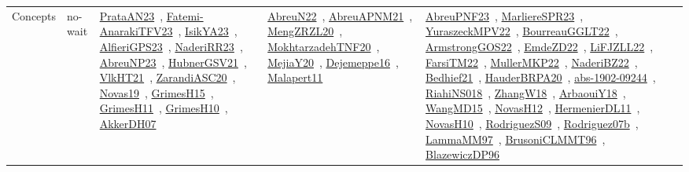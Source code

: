 {\begin{longtable}{lp{3cm}>{\raggedright\arraybackslash}p{6cm}>{\raggedright\arraybackslash}p{6cm}>{\raggedright\arraybackslash}p{8cm}}
Concepts & no-wait & \href{../works/PrataAN23.pdf}{PrataAN23}~\cite{PrataAN23}, \href{../works/Fatemi-AnarakiTFV23.pdf}{Fatemi-AnarakiTFV23}~\cite{Fatemi-AnarakiTFV23}, \href{../works/IsikYA23.pdf}{IsikYA23}~\cite{IsikYA23}, \href{../works/AlfieriGPS23.pdf}{AlfieriGPS23}~\cite{AlfieriGPS23}, \href{../works/NaderiRR23.pdf}{NaderiRR23}~\cite{NaderiRR23}, \href{../works/AbreuNP23.pdf}{AbreuNP23}~\cite{AbreuNP23}, \href{../works/HubnerGSV21.pdf}{HubnerGSV21}~\cite{HubnerGSV21}, \href{../works/VlkHT21.pdf}{VlkHT21}~\cite{VlkHT21}, \href{../works/ZarandiASC20.pdf}{ZarandiASC20}~\cite{ZarandiASC20}, \href{../works/Novas19.pdf}{Novas19}~\cite{Novas19}, \href{../works/GrimesH15.pdf}{GrimesH15}~\cite{GrimesH15}, \href{../works/GrimesH11.pdf}{GrimesH11}~\cite{GrimesH11}, \href{../works/GrimesH10.pdf}{GrimesH10}~\cite{GrimesH10}, \href{../works/AkkerDH07.pdf}{AkkerDH07}~\cite{AkkerDH07} & \href{../works/AbreuN22.pdf}{AbreuN22}~\cite{AbreuN22}, \href{../works/AbreuAPNM21.pdf}{AbreuAPNM21}~\cite{AbreuAPNM21}, \href{../works/MengZRZL20.pdf}{MengZRZL20}~\cite{MengZRZL20}, \href{../works/MokhtarzadehTNF20.pdf}{MokhtarzadehTNF20}~\cite{MokhtarzadehTNF20}, \href{../works/MejiaY20.pdf}{MejiaY20}~\cite{MejiaY20}, \href{../works/Dejemeppe16.pdf}{Dejemeppe16}~\cite{Dejemeppe16}, \href{../works/Malapert11.pdf}{Malapert11}~\cite{Malapert11} & \href{../works/AbreuPNF23.pdf}{AbreuPNF23}~\cite{AbreuPNF23}, \href{../works/MarliereSPR23.pdf}{MarliereSPR23}~\cite{MarliereSPR23}, \href{../works/YuraszeckMPV22.pdf}{YuraszeckMPV22}~\cite{YuraszeckMPV22}, \href{../works/BourreauGGLT22.pdf}{BourreauGGLT22}~\cite{BourreauGGLT22}, \href{../works/ArmstrongGOS22.pdf}{ArmstrongGOS22}~\cite{ArmstrongGOS22}, \href{../works/EmdeZD22.pdf}{EmdeZD22}~\cite{EmdeZD22}, \href{../works/LiFJZLL22.pdf}{LiFJZLL22}~\cite{LiFJZLL22}, \href{../works/FarsiTM22.pdf}{FarsiTM22}~\cite{FarsiTM22}, \href{../works/MullerMKP22.pdf}{MullerMKP22}~\cite{MullerMKP22}, \href{../works/NaderiBZ22.pdf}{NaderiBZ22}~\cite{NaderiBZ22}, \href{../works/Bedhief21.pdf}{Bedhief21}~\cite{Bedhief21}, \href{../works/HauderBRPA20.pdf}{HauderBRPA20}~\cite{HauderBRPA20}, \href{../works/abs-1902-09244.pdf}{abs-1902-09244}~\cite{abs-1902-09244}, \href{../works/RiahiNS018.pdf}{RiahiNS018}~\cite{RiahiNS018}, \href{../works/ZhangW18.pdf}{ZhangW18}~\cite{ZhangW18}, \href{../works/ArbaouiY18.pdf}{ArbaouiY18}~\cite{ArbaouiY18}, \href{../works/WangMD15.pdf}{WangMD15}~\cite{WangMD15}, \href{../works/NovasH12.pdf}{NovasH12}~\cite{NovasH12}, \href{../works/HermenierDL11.pdf}{HermenierDL11}~\cite{HermenierDL11}, \href{../works/NovasH10.pdf}{NovasH10}~\cite{NovasH10}, \href{../works/RodriguezS09.pdf}{RodriguezS09}~\cite{RodriguezS09}, \href{../works/Rodriguez07b.pdf}{Rodriguez07b}~\cite{Rodriguez07b}, \href{../works/LammaMM97.pdf}{LammaMM97}~\cite{LammaMM97}, \href{../works/BrusoniCLMMT96.pdf}{BrusoniCLMMT96}~\cite{BrusoniCLMMT96}, \href{../works/BlazewiczDP96.pdf}{BlazewiczDP96}~\cite{BlazewiczDP96}\\

\end{longtable}}
